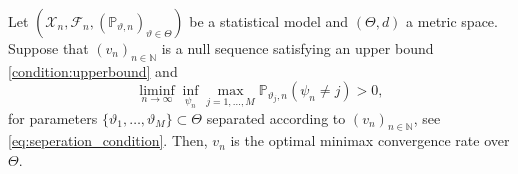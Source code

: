 \documentclass[a4paper]{article}
\begin{document}
\begin{propositionrep}
	\label{result:reduction_scheme}
	Let $(\mathcal{X}_n, \mathcal{F}_n, (\mathbb{P}_{\vartheta,n})_{\vartheta \in \Theta})$ be a statistical model and $(\Theta, d)$ a metric space. Suppose that $(v_n)_{n \in \mathbb{N}}$ is a null sequence satisfying an upper bound \eqref{condition:upperbound} and
	\begin{equation*}
		\liminf_{n \rightarrow \infty} \inf_{\psi_n} \max_{j=1,\dots,M} \mathbb{P}_{\vartheta_j,n}(\psi_n \neq j)>0,
	\end{equation*}
    for parameters $\{\vartheta_1, \dots, \vartheta_M\} \subset \Theta$ separated according to $(v_n)_{n \in \mathbb{N}}$, see \eqref{eq:seperation_condition}.	Then, $v_n$ is the optimal minimax convergence rate over $\Theta$.
\end{propositionrep}
\end{document}
